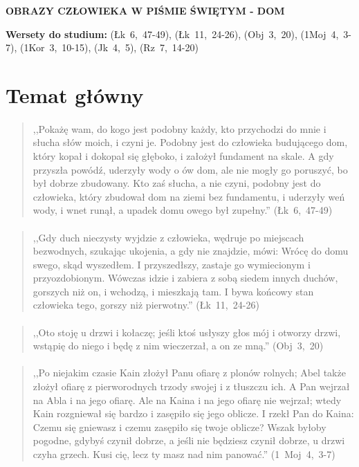 \documentclass[10pt,a4paper,oneside]{article}
\begin{document}
\centerline{\textbf{\MakeUppercase{Obrazy człowieka w Piśmie Świętym - dom}}}
\begin{center}
\textbf{Wersety do studium:} \mbox{(Łk 6, 47-49)}, \mbox{(Łk 11, 24-26)}, \mbox{(Obj 3, 20)}, \mbox{(1Moj 4, 3-7)}, \mbox{(1Kor 3, 10-15)}, \mbox{(Jk 4, 5)}, \mbox{(Rz 7, 14-20)}
\end{center}
\section{Temat główny}
\paragraph{}
\begin{quote}
,,Pokażę wam, do kogo jest podobny każdy, kto przychodzi do mnie i słucha słów moich, i czyni je. Podobny jest do człowieka budującego dom, który kopał i dokopał się głęboko, i założył fundament na skale. A gdy przyszła powódź, uderzyły wody o ów dom, ale nie mogły go poruszyć, bo był dobrze zbudowany. Kto zaś słucha, a nie czyni, podobny jest do człowieka, który zbudował dom na ziemi bez fundamentu, i uderzyły weń wody, i wnet runął, a upadek domu owego był zupełny.'' \mbox{(Łk 6, 47-49)}
\end{quote}
\paragraph{}
\begin{quote}
,,Gdy duch nieczysty wyjdzie z człowieka, wędruje po miejscach bezwodnych, szukając ukojenia, a gdy nie znajdzie, mówi: Wrócę do domu swego, skąd wyszedłem. I przyszedłszy, zastaje go wymiecionym i przyozdobionym. Wówczas idzie i zabiera z sobą siedem innych duchów, gorszych niż on, i wchodzą, i mieszkają tam. I bywa końcowy stan człowieka tego, gorszy niż pierwotny.'' \mbox{(Łk 11, 24-26)}
\end{quote}
\paragraph{}
\begin{quote}
,,Oto stoję u drzwi i kołaczę; jeśli ktoś usłyszy głos mój i otworzy drzwi, wstąpię do niego i będę z nim wieczerzał, a on ze mną.'' \mbox{(Obj 3, 20)}
\end{quote}
\paragraph{}
\begin{quote}
,,Po niejakim czasie Kain złożył Panu ofiarę z plonów rolnych; Abel także złożył ofiarę z pierworodnych trzody swojej i z tłuszczu ich. A Pan wejrzał na Abla i na jego ofiarę. Ale na Kaina i na jego ofiarę nie wejrzał; wtedy Kain rozgniewał się bardzo i zasępiło się jego oblicze. I rzekł Pan do Kaina: Czemu się gniewasz i czemu zasępiło się twoje oblicze? Wszak byłoby pogodne, gdybyś czynił dobrze, a jeśli nie będziesz czynił dobrze, u drzwi czyha grzech. Kusi cię, lecz ty masz nad nim panować.'' \mbox{(1 Moj 4, 3-7)}
\end{quote}
\end{document}
